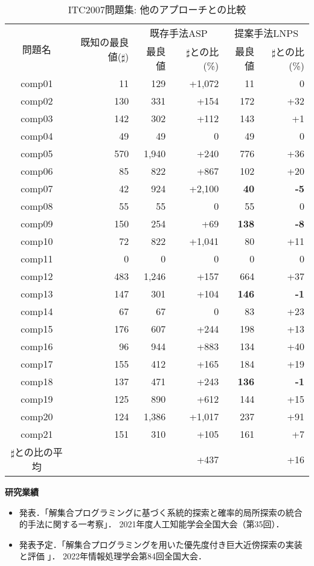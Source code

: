 \documentclass[dvipdfmx,a4paper]{jsarticle}
\begin{document}
\begin{table}[h]
 \centering
 \footnotesize
 \caption{ITC2007問題集: 他のアプローチとの比較}
{
\begin{tabular}{c|r|rr|rr}
\hline
    \multirow{2}{*}{問題名} & \multirow{2}{*}{既知の最良値($\sharp$)} & 
    \multicolumn{2}{c|}{既存手法ASP} & \multicolumn{2}{c}{提案手法LNPS}\\\cline{3-6}
    &  & 最良値 & $\sharp$との比(\%) & 最良値 & $\sharp$との比(\%)\\\hline
{comp01} & 11 & 129 & +1,072 & 11 & 0\\
{comp02} & 130 & 331 & +154 & 172 & +32\\
{comp03} & 142 & 302 & +112 & 143 & +1\\
{comp04} & 49 & 49 & 0 & 49 & 0\\
{comp05} & 570 & 1,940 & +240 & 776 & +36\\
{comp06} & 85 & 822 & +867 & 102 & +20\\
{comp07} & 42 & 924 & +2,100 & \bf{40} & \bf{-5}\\
{comp08} & 55 & 55 & 0 & 55 & 0\\
{comp09} & 150 & 254 & +69 & \bf{138} & \bf{-8}\\
{comp10} & 72 & 822 & +1,041 & 80 & +11\\
{comp11} & 0 & 0 & 0 & 0 & 0\\
{comp12} & 483 & 1,246 & +157 & 664 & +37\\
{comp13} & 147 & 301 & +104 & \bf{146} & \bf{-1}\\
{comp14} & 67 & 67 & 0 & 83 & +23\\
{comp15} & 176 & 607 & +244 & 198 & +13\\
{comp16} & 96 & 944 & +883 & 134 & +40\\
{comp17} & 155 & 412 & +165 & 184 & +19\\
{comp18} & 137 & 471 & +243 & \bf{136} & \bf{-1}\\
{comp19} & 125 & 890 & +612 & 144 & +15\\
{comp20} & 124 & 1,386 & +1,017 & 237 & +91\\
{comp21} & 151 & 310 & +105 & 161 & +7\\\hline
{$\sharp$との比の平均} & & & +437 & & +16\\\hline
 \end{tabular}
}
\end{table}

\textbf{研究業績}
\begin{itemize}
 \small
 \item 発表．「解集合プログラミングに基づく系統的探索と確率的局所探索の統合的手法に関する一考察」．
	   2021年度人工知能学会全国大会（第35回）．
 \item 発表予定．「解集合プログラミングを用いた優先度付き巨大近傍探索の実装と評価 」．
      2022年情報処理学会第84回全国大会．
\end{itemize}
\end{document}
